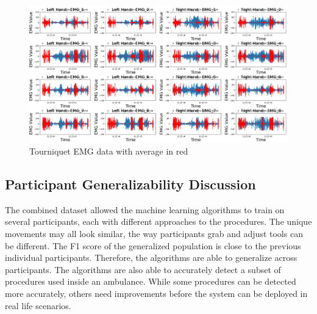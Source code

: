\begin{figure}[!h]
	\centering
	\includegraphics[width=0.7\linewidth]{pictures/5187_EMG_Day3_t_1_average}
	\caption{Tourniquet EMG data with average in red}
	\label{fig:5187emgday3t1average}
\end{figure}

\subsection{Participant Generalizability Discussion}
\label{sec:Results:Generalizability:Discussion}

The combined dataset allowed the machine learning algorithms to train on several participants, each with different approaches to the procedures. The unique movements may all look similar, the way participants grab and adjust tools can be different. 
The F1 score of the generalized population is close to the previous individual participants. Therefore, the algorithms are able to generalize across participants. The algorithms are also able to accurately detect a subset of procedures used inside an ambulance. While some procedures can be detected more accurately, others need improvements before the system can be deployed in real life scenarios.


